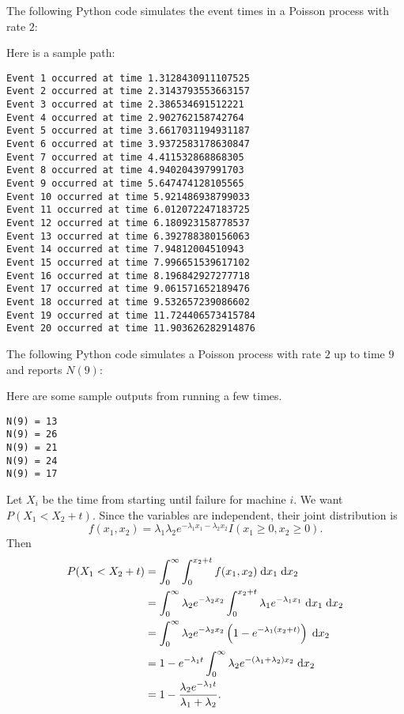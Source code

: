 \documentclass{homework}
\begin{document}
	\question 
	\begin{alphaparts}
		\questionpart The following Python code simulates the event times in a Poisson process with rate $2$:
		
		
		
		Here is a sample path:
		\begin{lstlisting}[frame=single, basicstyle=\small\ttfamily]
Event 1 occurred at time 1.3128430911107525
Event 2 occurred at time 2.3143793553663157
Event 3 occurred at time 2.386534691512221
Event 4 occurred at time 2.902762158742764
Event 5 occurred at time 3.6617031194931187
Event 6 occurred at time 3.9372583178630847
Event 7 occurred at time 4.411532868868305
Event 8 occurred at time 4.940204397991703
Event 9 occurred at time 5.647474128105565
Event 10 occurred at time 5.921486938799033
Event 11 occurred at time 6.012072247183725
Event 12 occurred at time 6.180923158778537
Event 13 occurred at time 6.392788380156063
Event 14 occurred at time 7.94812004510943
Event 15 occurred at time 7.996651539617102
Event 16 occurred at time 8.196842927277718
Event 17 occurred at time 9.061571652189476
Event 18 occurred at time 9.532657239086602
Event 19 occurred at time 11.724406573415784
Event 20 occurred at time 11.903626282914876
		\end{lstlisting}
		
		\questionpart The following Python code simulates a Poisson process with rate $2$ up to time $9$ and reports $N(9)$:
		
		
		
		Here are some sample outputs from running a few times.
		\begin{lstlisting}[frame=single, basicstyle=\small\ttfamily]
N(9) = 13
N(9) = 26
N(9) = 21
N(9) = 24
N(9) = 17
		\end{lstlisting}
	\end{alphaparts}
	
	Let $X_i$ be the time from starting until failure for machine $i$. We want $P(X_1 < X_2 + t)$. Since the variables are independent, their joint distribution is
	\begin{equation*}
		f(x_1, x_2) = \lambda_1\lambda_2e^{-\lambda_1x_1 -\lambda_2x_2}I(x_1 \ge 0, x_2\ge 0).
	\end{equation*}
	Then
	\begin{align*}
		P(X_1 < X_2 + t) &= \int_0^\infty \int_0^{x_2 + t} f(x_1, x_2)\;\text{d} x_1 \;\text{d} x_2 \\
		&= \int_0^\infty \lambda_2 e^{-\lambda_2x_2}\int_0^{x_2+t} \lambda_1 e^{-\lambda_1x_1}\;\text{d} x_1 \;\text{d} x_2 \\
		&= \int_0^\infty \lambda_2 e^{-\lambda_2x_2} \left(1 - e^{-\lambda_1(x_2+t)}\right)\;\text{d} x_2 \\
		&= 1- e^{-\lambda_1t}\int_0^\infty \lambda_2e^{-(\lambda_1+\lambda_2)x_2}\;\text{d} x_2 \\
		&= 1 - \frac{\lambda_2 e^{-\lambda_1t}}{\lambda_1 + \lambda_2}.
	\end{align*}
	
\end{document}
